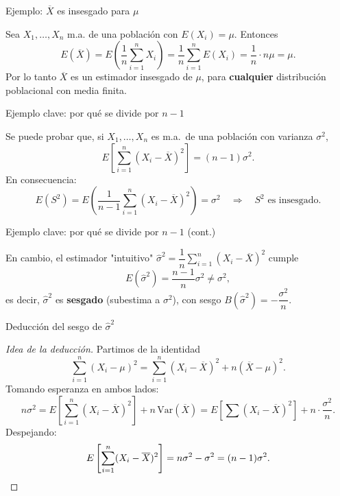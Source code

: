 \documentclass[aspectratio=169,11pt]{beamer}
\begin{document}
\begin{frame}{Ejemplo: $\overline{X}$ es insesgado para $\mu$}
\begin{example}
Sea $X_1,\dots,X_n$ m.a. de una población con $E(X_i)=\mu$. Entonces
\[
E(\overline{X}) = E\left(\frac{1}{n}\sum_{i=1}^n X_i\right) = \frac{1}{n}\sum_{i=1}^n E(X_i) = \frac{1}{n}\cdot n\mu = \mu.
\]
Por lo tanto $\overline{X}$ es un estimador insesgado de $\mu$, para \textbf{cualquier} distribución poblacional con media finita.
\end{example}
\end{frame}

\begin{frame}{Ejemplo clave: por qué se divide por $n-1$}
\begin{example}
Se puede probar que, si $X_1,\dots,X_n$ es m.a.\ de una población con varianza $\sigma^2$,
\[
E\left[\sum_{i=1}^n (X_i-\overline X)^2\right] = (n-1)\sigma^2 .
\]
En consecuencia:
\[
E(S^2) = E\left(\frac{1}{n-1}\sum_{i=1}^n (X_i-\overline X)^2\right) = \sigma^2 \quad \Rightarrow\quad S^2 \text{ es insesgado.}
\]
\end{example}
\end{frame}

\begin{frame}{Ejemplo clave: por qué se divide por $n-1$ (cont.)}
\begin{example}
En cambio, el estimador "intuitivo" $\widehat\sigma^2 = \dfrac{1}{n}\sum_{i=1}^n (X_i-\overline X)^2$ cumple
\[
E(\widehat\sigma^2) = \frac{n-1}{n}\sigma^2 \neq \sigma^2,
\]
es decir, $\widehat\sigma^2$ es \textbf{sesgado} (subestima a $\sigma^2$), con sesgo $B(\widehat\sigma^2) = -\dfrac{\sigma^2}{n}$.
\end{example}
\end{frame}

\begin{frame}{Deducción del sesgo de $\widehat\sigma^2$}
\begin{proof}[Idea de la deducción]
Partimos de la identidad
\[
\sum_{i=1}^n (X_i-\mu)^2 = \sum_{i=1}^n (X_i - \overline X)^2 + n(\overline X - \mu)^2.
\]
Tomando esperanza en ambos lados:
\[
n\sigma^2 = E\left[\sum_{i=1}^n (X_i-\overline X)^2\right] + n\,\mathrm{Var}(\overline X) = E\left[\sum (X_i-\overline X)^2\right] + n\cdot\frac{\sigma^2}{n}.
\]
Despejando:
\[
E\left[\sum_{i=1}^n (X_i-\overline X)^2\right] = n\sigma^2 - \sigma^2 = (n-1)\sigma^2. \qedhere
\]
\end{proof}
\end{frame}
\end{document}
